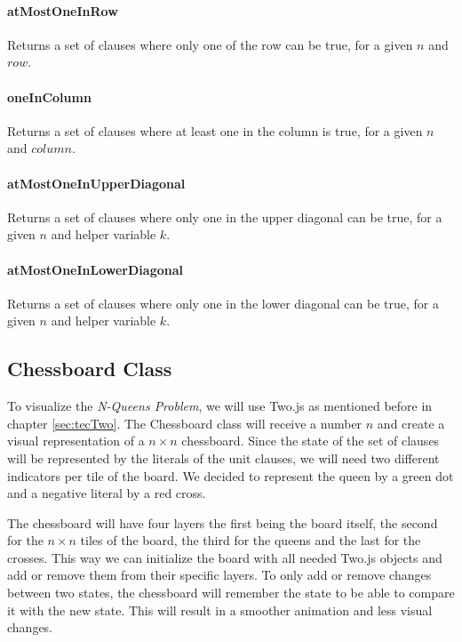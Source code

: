 \paragraph{atMostOneInRow}
Returns a set of clauses where only one of the row can be true, for a given $n$ and $row$.

\paragraph{oneInColumn}
Returns a set of clauses where at least one in the column is true, for a given $n$ and $column$.

\paragraph{atMostOneInUpperDiagonal}
Returns a set of clauses where only one in the upper diagonal can be true, for a given $n$ and helper variable $k$.

\paragraph{atMostOneInLowerDiagonal}
Returns a set of clauses where only one in the lower diagonal can be true, for a given $n$ and helper variable $k$.

\subsection{Chessboard Class}
\label{sub:impChessboard}
To visualize the \textit{N-Queens Problem}, we will use Two.js as mentioned before in chapter \ref{sec:tecTwo}. The Chessboard class will receive a number $n$ and create a visual representation of a $n \times n$ chessboard. Since the state of the set of clauses will be represented by the literals of the unit clauses, we will need two different indicators per tile of the board. We decided to represent the queen by a green dot and a negative literal by a red cross.

The chessboard will have four layers the first being the board itself, the second for the $n \times n$ tiles of the board, the third for the queens and the last for the crosses. This way we can initialize the board with all needed Two.js objects and add or remove them from their specific layers. To only add or remove changes between two states, the chessboard will remember the state to be able to compare it with the new state. This will result in a smoother animation and less visual changes.

